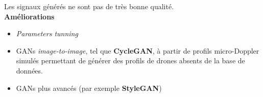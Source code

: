 \documentclass[a0,portrait]{a0poster}
\begin{document}
\begin{multicols}{2}
\begin{tcolorbox}[colback=blue!5!white,colframe=blue!75!black,title,title={\section*{Résultats}}]
\begin{center}
\end{center}
\begin{center}
\end{center}
\end{tcolorbox}
\bigskip


\begin{tcolorbox}[colback=red!5!orange,colframe=red!75!black,title={\section*{Perspectives}}]
Les signaux générés ne sont pas de très bonne qualité.\\
\textbf{Améliorations}
\begin{itemize}
    \item \textit{Parameters tunning}
    \item GANs \textit{image-to-image}, tel que \textbf{CycleGAN}, à partir de profils micro-Doppler simulés permettant de générer des profils de drones absents de la base de données.
    \item GANs plus avancés (par exemple \textbf{StyleGAN})
\end{itemize}
\end{tcolorbox}

\end{multicols}
\end{document}
